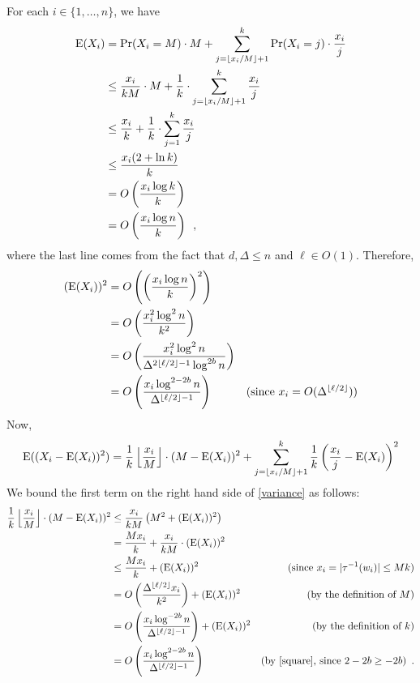 \documentclass{patmorin}
\begin{document}
For each $i\in\{1,\ldots,n\}$, we have
\begin{align*}
  \mathrm{E}(X_i)
  & =\Pr(X_i=M)\cdot M + \sum_{j=\lfloor x_i/M\rfloor+1}^k \Pr(X_i=j)\cdot\frac{x_i}{j} \\
  & \le\frac{x_i}{kM}\cdot M + \frac{1}{k}\cdot\sum_{j=\lfloor x_i/M\rfloor+1}^k \frac{x_i}{j} \\
  & \le\frac{x_i}{k} + \frac{1}{k}\cdot\sum_{j=1}^k \frac{x_i}{j} \\
  & \le \frac{x_i(2+\ln k)}{k} \\
  & = O\left(\frac{x_i\log k}{k}\right) \\
  & = O\left(\frac{x_i\log n}{k}\right)
  \enspace ,
\end{align*}
where the last line comes from the fact that $d,\Delta \le n$ and $\ell\in O(1)$.
Therefore,
\begin{align}
  (\mathrm{E}(X_i))^2
  & = O\left(\left(\frac{x_i\log n}{k}\right)^2\right) \nonumber \\
  & = O\left(\frac{x_i^2\log^2 n}{k^2}\right) \nonumber \\
  & = O\left(\frac{x_i^2\log^2 n}{\Delta^{2\lfloor\ell/2\rfloor-1}\log^{2b} n}\right) \nonumber \\
  & = O\left(\frac{x_i\log^{2-2b} n}{\Delta^{\lfloor\ell/2\rfloor-1}}\right)
   & \text{(since $x_i=O(\Delta^{\lfloor\ell/2\rfloor})$)} \label{square}
\end{align}
Now,
\begin{equation}
  \mathrm{E}((X_i-\mathrm{E}(X_i))^2)  = \frac{1}{k}\left\lfloor\frac{x_i}{M}\right\rfloor\cdot(M-\mathrm{E}(X_i))^2 + \sum_{j=\lfloor x_i/M\rfloor+1}^k \frac{1}{k}\left(\frac{x_i}{j}-\mathrm{E}(X_i)\right)^2 \label{variance}
\end{equation}
We bound the first term on the right hand side of \cref{variance} as follows:
\begin{align*}
  \frac{1}{k}\left\lfloor\frac{x_i}{M}\right\rfloor\cdot(M-\E(X_i))^2
  & \le \frac{x_i}{kM}\left(M^2 + (\E(X_i))^2\right) \\
  & = \frac{M x_i}{k} + \frac{x_i}{kM}\cdot (\E(X_i))^2 \\
  & \le \frac{M x_i}{k} + (\E(X_i))^2
  & \text{(since $x_i=|\tau^{-1}(w_i)|\le Mk$)}\\
  & = O\left(\frac{\Delta^{\lfloor\ell/2\rfloor}x_i}{k^2}\right) + (\E(X_i))^2
  & \text{(by the definition of $M$)}\\
  & = O\left(\frac{x_i\log^{-2b} n}{\Delta^{\lfloor\ell/2\rfloor-1}}\right) + (\E(X_i))^2
  & \text{(by the definition of $k$)}\\
  & = O\left(\frac{x_i\log^{2-2b} n}{\Delta^{\lfloor\ell/2\rfloor-1}}\right)
  & \text{(by \cref{square}, since $2-2b\ge -2b$)} \enspace .
\end{align*}
\end{document}
